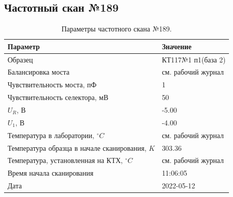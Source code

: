 \subsection{Частотный скан №189}
\begin{table}[!ht]
    \centering
    \caption{Параметры частотного скана №189.}
    \begin{tabular}{|l|l|}
        \hline
        Параметр                                       & Значение                  \\ \hline
        Образец                                        & КТ117№1 п1(база 2)        \\ \hline
        Балансировка моста                             & см. рабочий журнал        \\ \hline
        Чувствительность моста, пФ                     & 1                         \\ \hline
        Чувствительность селектора, мВ                 & 50                        \\ \hline
        $U_R$, В                                       & -5.00                     \\ \hline
        $U_1$, В                                       & -4.00                     \\ \hline
        Температура в лаборатории, $^\circ C$          & см. рабочий журнал        \\ \hline
        Температура образца в начале сканирования, $K$ & 303.36                    \\ \hline
        Температура, установленная на КТХ, $^\circ C$  & см. рабочий журнал        \\ \hline
        Время начала сканирования                      & 11:06:05                  \\ \hline
        Дата                                           & 2022-05-12                \\ \hline
    \end{tabular}
    \label{table:frequency_scan_189}
\end{table}

